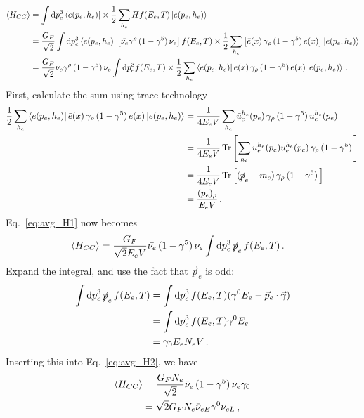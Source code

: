\begin{align}\label{eq:avg_H1}
    \left\langle {H_{CC}} \right \rangle &= \int \dd p_e^3 \bra{e(p_e,h_e)} \times \frac{1}{2} \sum_{h_e} H   f(E_e,T) \ket{e(p_e,h_e)} \nonumber \\
           &= \frac{G_F}{\sqrt{2}} \int \dd p_e^3 \bra{e(p_e,h_e)} \left[ \bar{\nu_e} \gamma^\rho\, (1- \gamma^5)\, \nu_e \right]  f(E_e,T) \times \frac{1}{2} \sum_{h_e} \left[\bar e(x) \,\gamma_\rho\, (1- \gamma^5)\, e(x) \right] \ket{e(p_e,h_e)} \nonumber \\
           &= \frac{G_F}{\sqrt{2}} \bar{\nu_e} \gamma^\rho\, (1- \gamma^5)\, \nu_e \int \dd p_e^3  f(E_e,T) \times \frac{1}{2} \sum_{h_e} \bra{e(p_e,h_e)} \bar e(x) \,\gamma_\rho\, (1- \gamma^5)\, e(x)   \ket{e(p_e,h_e)}\,.
\end{align}
First, calculate the sum using trace technology %
\begin{align}\label{eq:helicity_sum}
    \frac{1}{2} \sum_{h_e} \bra{e(p_e,h_e)} \bar e(x) \,\gamma_\rho\, (1- \gamma^5)\, e(x)   \ket{e(p_e,h_e)} &= \frac{1}{4E_e V} \sum_{h_e} \bar{u}_e^{h_e}(p_e) \,\gamma_\rho\, (1- \gamma^5)\, u_e^{h_e}(p_e) \nonumber \\
    &= \frac{1}{4 E_e V} \Trace{\left[ \sum_{h_e} \bar{u}_e^{h_e}(p_e) u_e^{h_e}(p_e) \,\gamma_\rho\, (1- \gamma^5)\, \right]} \nonumber \\
    &= \frac{1}{4 E_e V} \Trace{\left[ (\slashed{p}_e + m_e ) \,\gamma_\rho\, (1- \gamma^5)\, \right]} \nonumber \\
    &= \frac{(p_e)_\rho}{E_e V}\,.
\end{align}
Eq.~\ref{eq:avg_H1} now becomes 
\begin{align}\label{eq:avg_H2}
    \left\langle {H_{CC}} \right \rangle &= \frac{G_F}{\sqrt{2}E_e V} \bar{\nu_e} \, (1- \gamma^5)\, \nu_e \int \dd p_e^3\, \slashed{p}_e\, f(E_e,T)\,.
\end{align}
Expand the integral, and use the fact that $\vec{p}_e$ is odd:
\begin{align}
    \int \dd p_e^3\, \slashed{p}_e\, f(E_e,T) &= \int \dd p_e^3\, f(E_e,T) (\gamma^0 E_e - \vec{p}_e \cdot \vec{\gamma}) \nonumber \\
                                              &= \int \dd p_e^3\, f(E_e,T) \gamma^0 E_e \nonumber \\
                                              &= \gamma_0 E_e N_e V\,.
\end{align}
Inserting this into Eq.~\ref{eq:avg_H2}, we have
\begin{align}
    \left\langle {H_{CC}} \right \rangle &= \frac{G_F N_e}{\sqrt{2}} \bar{\nu}_e \, (1- \gamma^5)\, \nu_e \gamma_0 \nonumber \\
            &= \sqrt{2}G_F N_e \bar{\nu}_{eE} \gamma^0 \nu_{eL}\,,
\end{align}
